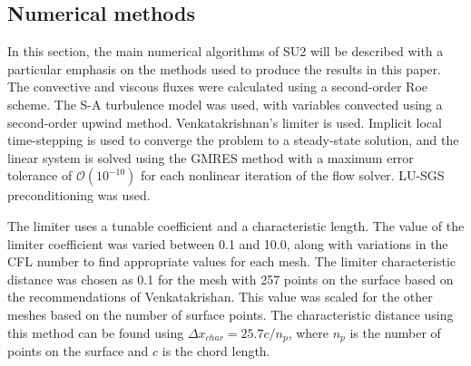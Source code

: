 
\subsection*{Numerical methods}
In this section, the main numerical algorithms of SU2 will be described with a particular emphasis on the methods used to produce the results in this paper. The convective and viscous fluxes were calculated using a second-order Roe scheme. The S-A turbulence model was used, with variables convected using a second-order upwind method. Venkatakrishnan's limiter is used. Implicit local time-stepping is used to converge the problem to a steady-state solution, and the linear system is solved using the GMRES method with a maximum error tolerance of $\mathcal{O}(10^{-10})$ for each nonlinear iteration of the flow solver. LU-SGS preconditioning was used.

The limiter uses a tunable coefficient and a characteristic length. The value of the limiter coefficient was varied between 0.1 and 10.0, along with variations in the CFL number to find appropriate values for each mesh. The limiter characteristic distance was chosen as 0.1 for the mesh with 257 points on the surface based on the recommendations of Venkatakrishan\cite{Venkatakrishnan:1993}. This value was scaled for the other meshes based on the number of surface points. The characteristic distance using this method can be found using $\Delta x_{char} = 25.7 c  / n_p $, where $n_p$ is the number of points on the surface and $c$ is the chord length. 

